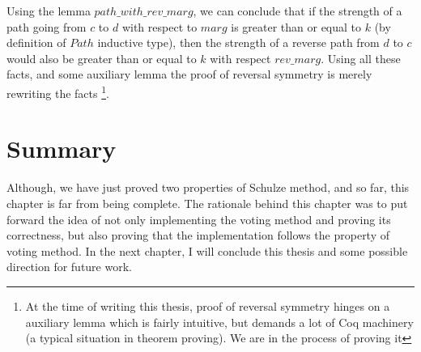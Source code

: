 Using the lemma $path\_with\_rev\_marg$, we can conclude that if the strength of 
a path going from $c$ to $d$ with respect to $marg$ is greater than or equal to $k$ 
(by definition of $Path$ inductive type), then the strength of a reverse path from $d$ to 
$c$ would also be greater than or equal to $k$ with respect $rev\_marg$. 
Using all these facts, and some auxiliary  lemma 
the proof of reversal symmetry is merely rewriting the facts
\footnote{At the time of writing this thesis, proof of reversal 
symmetry hinges on a auxiliary lemma which 
is fairly intuitive, but demands a lot of  Coq machinery (a typical situation 
in theorem proving). We are in the process of proving it}. 

 	
 
 \section{Summary}
 Although, we have just proved two properties of Schulze method, and so far, this chapter 
 is far from being complete. The rationale behind this chapter was to put forward the idea of 
 not only implementing the voting method and proving its correctness, but also proving that the implementation 
 follows the property of voting method. In the next chapter, I will conclude this thesis and some possible 
 direction for future work.  
 
 
 